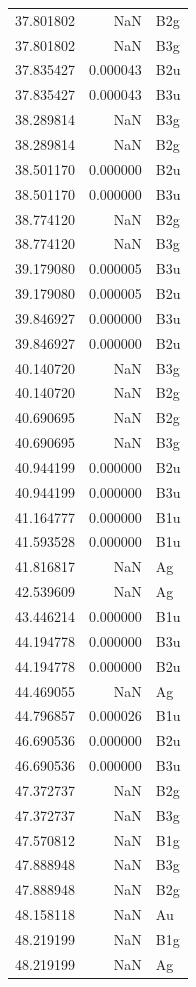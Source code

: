 \begin{longtable}{rrl}
37.801802 & NaN & B2g \\
37.801802 & NaN & B3g \\
37.835427 & 0.000043 & B2u \\
37.835427 & 0.000043 & B3u \\
38.289814 & NaN & B3g \\
38.289814 & NaN & B2g \\
38.501170 & 0.000000 & B2u \\
38.501170 & 0.000000 & B3u \\
38.774120 & NaN & B2g \\
38.774120 & NaN & B3g \\
39.179080 & 0.000005 & B3u \\
39.179080 & 0.000005 & B2u \\
39.846927 & 0.000000 & B3u \\
39.846927 & 0.000000 & B2u \\
40.140720 & NaN & B3g \\
40.140720 & NaN & B2g \\
40.690695 & NaN & B2g \\
40.690695 & NaN & B3g \\
40.944199 & 0.000000 & B2u \\
40.944199 & 0.000000 & B3u \\
41.164777 & 0.000000 & B1u \\
41.593528 & 0.000000 & B1u \\
41.816817 & NaN & Ag \\
42.539609 & NaN & Ag \\
43.446214 & 0.000000 & B1u \\
44.194778 & 0.000000 & B3u \\
44.194778 & 0.000000 & B2u \\
44.469055 & NaN & Ag \\
44.796857 & 0.000026 & B1u \\
46.690536 & 0.000000 & B2u \\
46.690536 & 0.000000 & B3u \\
47.372737 & NaN & B2g \\
47.372737 & NaN & B3g \\
47.570812 & NaN & B1g \\
47.888948 & NaN & B3g \\
47.888948 & NaN & B2g \\
48.158118 & NaN & Au \\
48.219199 & NaN & B1g \\
48.219199 & NaN & Ag \\

\end{longtable}

